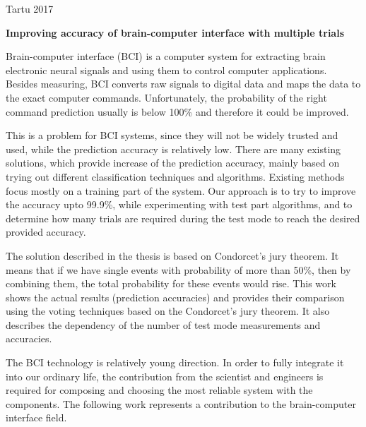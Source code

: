 \documentclass[12pt]{article}
\begin{document}
\vfill
\centerline{Tartu 2017}



\newpage
{}
\noindent\textbf{\large Improving accuracy of brain-computer interface with multiple trials}
\vspace*{2ex}
{ }

Brain-computer interface (BCI) is a computer system for extracting brain electronic neural signals and using them to control computer applications. Besides measuring, BCI converts raw signals to digital data and maps the data to the exact computer commands. Unfortunately, the probability of the right command prediction usually is below 100\% and therefore it could be improved.

This is a problem for BCI systems, since they will not be widely trusted and used, while the prediction accuracy is relatively low. There are many existing solutions, which provide increase of the prediction accuracy, mainly based on trying out different classification techniques and algorithms. Existing methods focus mostly on a training part of the system. Our approach is to try to improve the accuracy upto 99.9\%, while experimenting with test part algorithms, and to determine how many trials are required during the test mode to reach the desired provided accuracy.

The solution described in the thesis is based on Condorcet's jury theorem. It means that if we have single events with probability of more than 50\%, then by combining them, the total probability for these events would rise. This work shows the actual results (prediction accuracies) and provides their comparison using the voting techniques based on the Condorcet's jury theorem. It also describes the dependency of the number of test mode measurements and accuracies.

The BCI technology is relatively young direction. In order to fully integrate it into our ordinary life, the contribution from the scientist and engineers is required for composing and choosing the most reliable system with the components. The following work represents a contribution to the brain-computer interface field.
\end{document}
